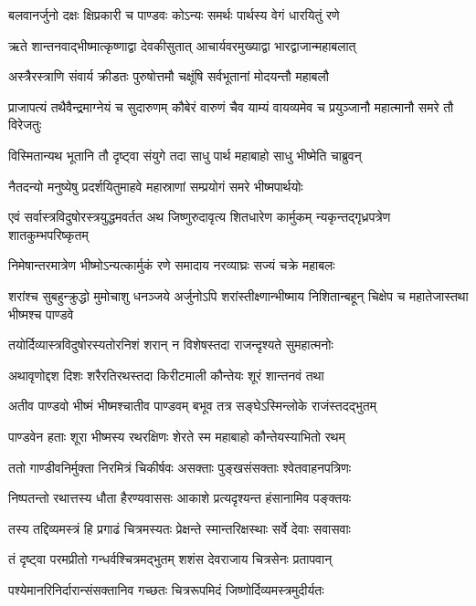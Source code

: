 \twolineshloka
{बलवानर्जुनो दक्षः क्षिप्रकारी च पाण्डवः}
{कोऽन्यः समर्थः पार्थस्य वेगं धारयितुं रणे}


\twolineshloka
{ऋते शान्तनवाद्भीष्मात्कृष्णाद्वा देवकीसुतात्}
{आचार्यवरमुख्याद्वा भारद्वाजान्महाबलात्}


\twolineshloka
{अस्त्रैरस्त्राणि संवार्य क्रीडतः पुरुषोत्तमौ}
{चक्षूंषि सर्वभूतानां मोदयन्तौ महाबलौ}


\threelineshloka
{प्राजापत्यं तथैवैन्द्रमाग्नेयं च सुदारुणम्}
{कौबेरं वारुणं चैव याम्यं वायव्यमेव च}
{प्रयुञ्जानौ महात्मानौ समरे तौ विरेजतुः}


\twolineshloka
{विस्मितान्यथ भूतानि तौ दृष्ट्वा संयुगे तदा}
{साधु पार्थ महाबाहो साधु भीष्मेति चाब्रुवन्}


\twolineshloka
{नैतदन्यो मनुष्येषु प्रदर्शयितुमाहवे}
{महास्राणां सम्प्रयोगं समरे भीष्मपार्थयोः}


\onelineshloka
{एवं सर्वास्त्रविदुषोरस्त्रयुद्धमवर्तत}
\twolineshloka
{अथ जिष्णुरुदावृत्य शितधारेण कार्मुकम्}
{न्यकृन्तद्गृध्रपत्रेण शातकुम्भपरिष्कृतम्}


\twolineshloka
{निमेषान्तरमात्रेण भीष्मोऽन्यत्कार्मुकं रणे}
{समादाय नरव्याघ्रः सज्यं चक्रे महाबलः}


\threelineshloka
{शरांश्च सुबहुन्क्रुद्धो मुमोचाशु धनञ्जये}
{अर्जुनोऽपि शरांस्तीक्ष्णान्भीष्माय निशितान्बहून्}
{चिक्षेप च महातेजास्तथा भीष्मश्च पाण्डवे}


\twolineshloka
{तयोर्दिव्यास्त्रविदुषोरस्यतोरनिशं शरान्}
{न विशेषस्तदा राजन्दृश्यते सुमहात्मनोः}


\twolineshloka
{अथावृणोद्दश दिशः शरैरतिरथस्तदा}
{किरीटमाली कौन्तेयः शूरं शान्तनवं तथा}


\twolineshloka
{अतीव पाण्डवो भीष्मं भीष्मश्चातीव पाण्डवम्}
{बभूव तत्र सङ्घेऽस्मिन्लोके राजंस्तदद्भुतम्}


\twolineshloka
{पाण्डवेन हताः शूरा भीष्मस्य रथरक्षिणः}
{शेरते स्म महाबाहो कौन्तेयस्याभितो रथम्}


\twolineshloka
{ततो गाण्डीवनिर्मुक्ता निरमित्रं चिकीर्षवः}
{असक्ताः पुङ्खसंसक्ताः श्वेतवाहनपत्रिणः}


\twolineshloka
{निष्पतन्तो रथात्तस्य धौता हैरण्यवाससः}
{आकाशे प्रत्यदृश्यन्त हंसानामिव पङ्क्तयः}


\twolineshloka
{तस्य तद्दिव्यमस्त्रं हि प्रगाढं चित्रमस्यतः}
{प्रेक्षन्ते स्मान्तरिक्षस्थाः सर्वे देवाः सवासवाः}


\twolineshloka
{तं दृष्ट्वा परमप्रीतो गन्धर्वश्चित्रमद्भुतम्}
{शशंस देवराजाय चित्रसेनः प्रतापवान्}


\twolineshloka
{पश्येमानरिनिर्दारान्संसक्तानिव गच्छतः}
{चित्ररूपमिदं जिष्णोर्दिव्यमस्त्रमुदीर्यतः}


